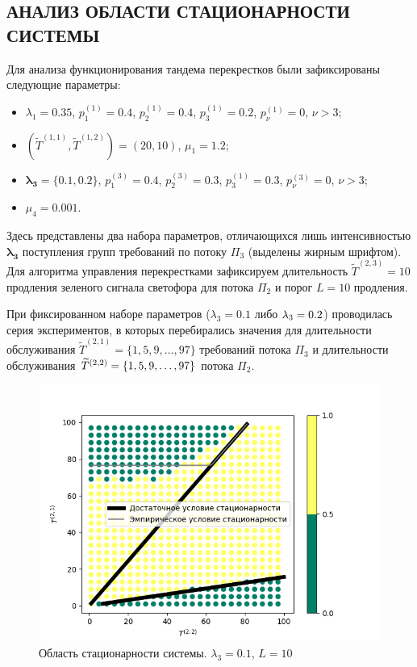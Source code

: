 \documentclass[11pt]{ubs}
\newcommand*{\hm}[1]{#1\nobreak\discretionary{}%
	{\hbox{$\mathsurround=0pt #1$}}{}}%
\begin{document}
\subsection{АНАЛИЗ ОБЛАСТИ СТАЦИОНАРНОСТИ СИСТЕМЫ}
Для анализа функционирования тандема перекрестков были зафиксированы следующие параметры:
\begin{itemize}
    \item $\lambda_1=0.35$, $p_{1}^{(1)}=0.4$, $p_{2}^{(1)}=0.4$, $p_{3}^{(1)}=0.2$, $p_{\nu}^{(1)}=0$, $\nu > 3$;
    \item $(\widetilde{T}^{(1,1)}, \widetilde{T}^{(1,2)})=(20,10)$, $\mu_1 = 1.2$;
    \item $\boldsymbol{ \lambda_3=\{0.1, 0.2\}}$, $p_{1}^{(3)}=0.4$, $p_{2}^{(3)}=0.3$, $p_{3}^{(1)}=0.3$, $p_{\nu}^{(3)}=0$, $\nu > 3$;
        \item $\mu_4= 0.001$.
\end{itemize}
Здесь представлены два набора параметров, отличающихся лишь интенсивностью $\boldsymbol{\lambda_3}$ поступления групп требований по потоку $\Pi_3$ (выделены жирным шрифтом). Для алгоритма управления перекрестками зафиксируем длительность $\widetilde{T}^{(2,3)}=10$ продления зеленого сигнала светофора для потока $\Pi_2$ и порог $L=10$ продления.

При фиксированном наборе параметров ($\lambda_3 = 0.1$ либо $\lambda_3 =\nobreak\discretionary{}{\hbox{$\mathsurround=0pt =$}}{} 0.2$) проводилась серия экспериментов, в которых перебирались значения для длительности обслуживания  $\widetilde{T}^{(2,1)} = \{1, 5, 9, \ldots, 97\}$ требований потока $\Pi_3$ и длительности обслуживания $\widetilde{T}^{(2,2)} \hm= \{1, 5, 9, \ldots, 97\}$ потока $\Pi_2$.

\begin{figure}[ht]
\centering
\includegraphics[scale=0.7]{0_1_thres_10_target_fact_.png} 
\caption{Область стационарности системы. $\lambda_3=0.1$, $L=10$}
\label{Experiment:stationar}
\end{figure}
\end{document}

